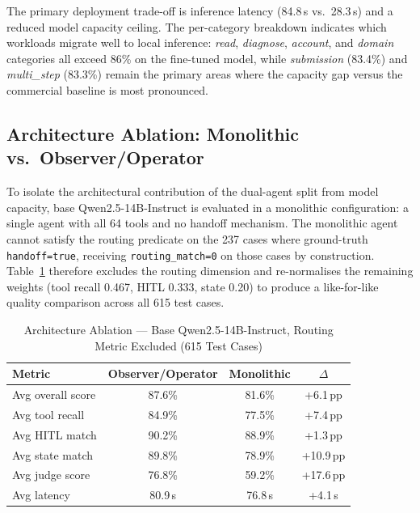 The primary deployment trade-off is inference latency (84.8\,s vs.\ 28.3\,s) and a reduced model capacity ceiling. The per-category breakdown indicates which workloads migrate well to local inference: \textit{read}, \textit{diagnose}, \textit{account}, and \textit{domain} categories all exceed 86\% on the fine-tuned model, while \textit{submission} (83.4\%) and \textit{multi\_step} (83.3\%) remain the primary areas where the capacity gap versus the commercial baseline is most pronounced.

\subsection{Architecture Ablation: Monolithic vs.\ Observer/Operator}
\label{sec:ablation}

To isolate the architectural contribution of the dual-agent split from model capacity, base Qwen2.5-14B-Instruct is evaluated in a monolithic configuration: a single agent with all 64 tools and no handoff mechanism. The monolithic agent cannot satisfy the routing predicate on the 237 cases where ground-truth \texttt{handoff=true}, receiving \texttt{routing\_match=0} on those cases by construction. Table~\ref{tab:ablation-monolithic} therefore excludes the routing dimension and re-normalises the remaining weights (tool recall 0.467, HITL 0.333, state 0.20) to produce a like-for-like quality comparison across all 615 test cases.

\begin{table}[H]
    \centering
    \caption{Architecture Ablation --- Base Qwen2.5-14B-Instruct, Routing Metric Excluded (615 Test Cases)}
    \label{tab:ablation-monolithic}
    \begin{tabular}{|l|c|c|c|}
        \hline
        \textbf{Metric} & \textbf{Observer/Operator} & \textbf{Monolithic} & \textbf{$\Delta$} \\
        \hline
        Avg overall score & 87.6\% & 81.6\% & +6.1\,pp \\
        Avg tool recall              & 84.9\% & 77.5\% & +7.4\,pp \\
        Avg HITL match               & 90.2\% & 88.9\% & +1.3\,pp \\
        Avg state match              & 89.8\% & 78.9\% & +10.9\,pp \\
        Avg judge score              & 76.8\% & 59.2\% & +17.6\,pp \\
        Avg latency                  & 80.9\,s & 76.8\,s & +4.1\,s \\
        \hline
    \end{tabular}
\end{table}

